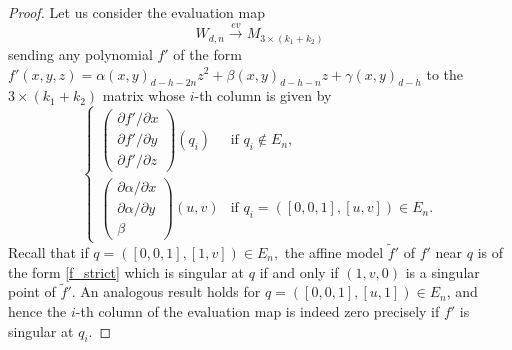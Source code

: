 \documentclass[10pt,a4paper,twoside]{amsart}
\theoremstyle{plain}
\theoremstyle{definition}
\theoremstyle{remark}
\begin{document}
\begin{proof}
Let us consider the evaluation map 
$$W_{d,n}
\xrightarrow{ev}M_{3\times (k_1+k_2)}$$ 
sending any polynomial $f'$ of the form $f'(x,y,z)=\alpha(x,y)_{d-h-2n}z^2+\beta(x,y)_{d-h-n}z+\gamma(x,y)_{d-h}$ to the $3\times (k_1+k_2)$ matrix whose $i\mbox{-}$th column is given by 
\begin{equation*}
\begin{cases}
\begin{pmatrix}\partial f'/\partial x\\ \partial f'/\partial y\\ \partial f'/\partial z\end{pmatrix}(q_i)& \text{if }q_i\not\in E_n,\\
\begin{pmatrix}\partial\alpha/\partial x\\ \partial\alpha/\partial y\\\beta\end{pmatrix}(u,v)& \text{if }q_i=(\left[0,0,1\right],\left[u,v\right])\in E_n.
\end{cases}
\end{equation*}
Recall that if $q=(\left[0,0,1\right],\left[1,v\right])\in E_n,$ the affine model $\tilde f'$ of $f'$ near $q$ is of the form \eqref{f_strict} which is singular at $q$ if and only if $(1,v,0)$ is a singular point of $\tilde f'$. An analogous result holds for $q=(\left[0,0,1\right],\left[u,1\right])\in E_n$, and hence the $i\mbox{-}$th column of the evaluation map is indeed zero precisely if $f'$ is singular at $q_i$. 


\end{proof}
\end{document}
